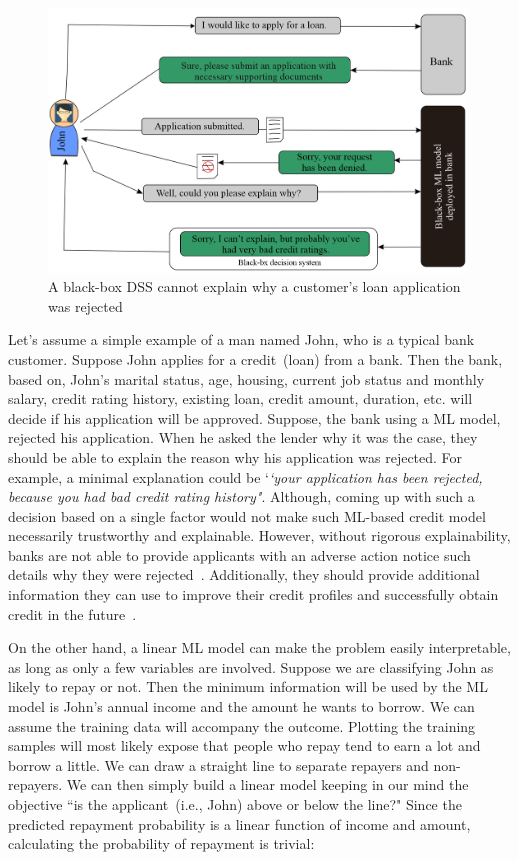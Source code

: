 \vspace{-4mm}
\begin{figure}[h]
	\centering
	\includegraphics[width=0.9\linewidth,height=70mm]{images/loan.png}
	\caption{A black-box DSS cannot explain why a customer's loan application was rejected}
    \label{fig:model_bbm}
    \vspace{-2mm}
\end{figure}

\hspace*{3.5mm} Let's assume a simple example of a man named John, who is a typical bank customer. Suppose John applies for a credit~(loan) from a bank.
Then the bank, based on, John's marital status, age, housing, current job status and monthly salary, credit rating history, existing loan, credit amount, duration, etc. will decide if his application will be approved. Suppose, the bank using a ML model, rejected his application. When he asked the lender why it was the case, they should be able to explain the reason why his application was rejected. For example, a minimal explanation could be `\textit{`your application has been rejected, because you had bad credit rating history"}. Although, coming up with such a decision based on a single factor would not make such ML-based credit model necessarily trustworthy and explainable.
However, without rigorous explainability, banks are not able to provide applicants with an adverse action notice such details why they were rejected~\cite{hall2020responsible}. Additionally, they should provide additional information they can use to improve their credit profiles and successfully obtain credit in the future~\cite{hall2020responsible}. 

\hspace*{3.5mm} On the other hand, a linear ML model can make the problem easily interpretable, as long as only a few variables are involved. Suppose we are classifying John as likely to repay or not. Then the minimum information will be used by the ML model is John's annual income and the amount he wants to borrow. We can assume the training data will accompany the outcome. Plotting the training samples will most likely expose that people who repay tend to earn a lot and borrow a little. We can draw a straight line to separate repayers and non-repayers. We can then simply build a linear model keeping in our mind the objective ``is the applicant~(i.e., John) above or below the line?" Since the predicted repayment probability is a linear function of income and amount, calculating the probability of repayment is trivial: 

